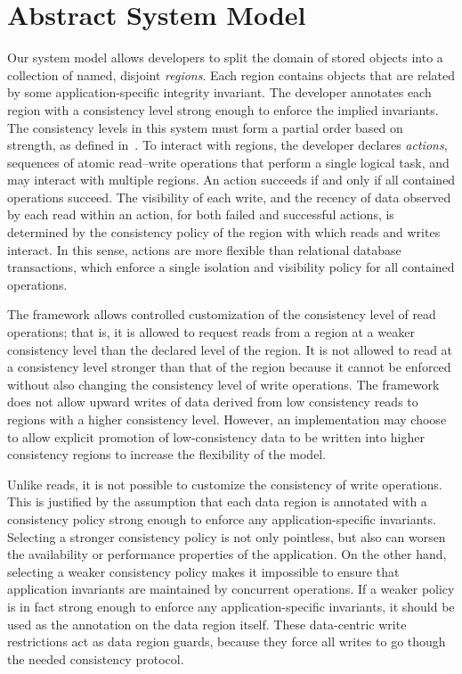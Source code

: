 \documentclass[preprint,numbers]{sigplanconf}
\begin{document}
\section{Abstract System Model}
\label{sec:model}
Our system model allows developers to split the domain of stored objects into a
collection of named, disjoint \emph{regions}. Each
region contains objects that are related by some application-specific integrity
invariant. The developer annotates each region with a consistency level 
strong enough to enforce the implied invariants. The consistency levels in this
system must form a partial order based on strength, as defined
in~\cite{sivaramakrishnan2015declarative}. To interact with regions, the developer
declares \emph{actions}, sequences of atomic
read--write operations that perform a single logical task, and may interact with
multiple regions. An action succeeds if and only if all contained operations
succeed. The visibility of each write, and the recency of
data observed by each read within an action, for both failed and successful
actions, is determined by the consistency policy of the region with which reads
and writes interact. In this sense, actions are more flexible than relational
database transactions, which enforce a single isolation and visibility policy for all contained
operations.

The framework allows controlled customization of 
the consistency level of read operations; that is, it is allowed to request
reads from a region at a weaker consistency level than the declared level of
the region. It is not allowed to read
at a consistency level stronger than that of the region
because it cannot be enforced without also changing the consistency
level of write operations.
The framework does not allow
upward writes of data derived from low
consistency reads to regions with a higher consistency level.
%
However, an implementation may choose to
allow explicit promotion of low-consistency data to be written into higher
consistency regions to increase the flexibility of the model.

Unlike reads, it is not possible to customize the consistency of write
operations. This is justified
by the assumption that each data region is annotated with a consistency policy strong enough to enforce 
any application-specific invariants. Selecting a stronger
consistency policy is not only pointless, but also can worsen
the availability or performance properties of the application. On the other hand,
selecting a weaker consistency policy makes it impossible to ensure that
application invariants are maintained by concurrent
operations. If a weaker policy is in fact strong enough to enforce any
application-specific
invariants, it should be used as the annotation on the data region itself. 
These data-centric write restrictions act as data region guards, because they force all writes to go
though the needed consistency protocol.
\end{document}
